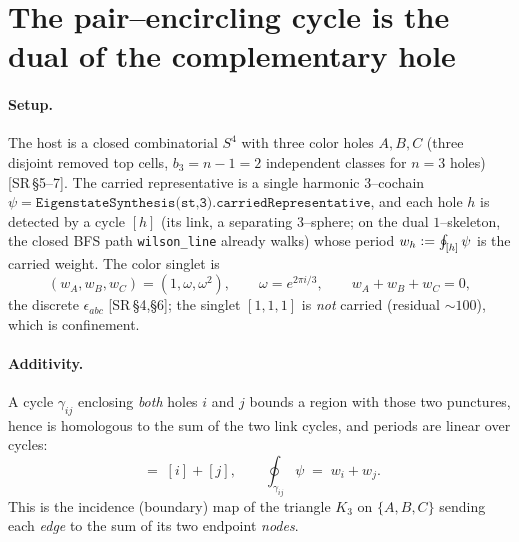 \documentclass[11pt,oneside]{article}
\newcommand{\eqdef}{\vcentcolon=}
\newcommand{\code}[1]{\texttt{#1}}
\theoremstyle{plain}
\begin{document}
\section{The pair--encircling cycle is the dual of the complementary hole}
\label{sec:duality}

\paragraph{Setup.}
The host is a closed combinatorial $S^4$ with three color holes $A,B,C$ (three
disjoint removed top cells, $b_3=n-1=2$ independent classes for $n=3$ holes)
[SR\,\S5--7]. The carried representative is a single harmonic $3$--cochain
$\psi=\code{EigenstateSynthesis(st,3).carriedRepresentative}$, and each hole $h$
is detected by a cycle $[h]$ (its link, a separating $3$--sphere; on the dual
$1$--skeleton, the closed BFS path \code{wilson\_line} already walks) whose period
$w_h\eqdef\oint_{[h]}\psi$ is the carried weight. The color singlet is
\begin{equation}
  (w_A,w_B,w_C)=(1,\omega,\omega^2),\qquad \omega=e^{2\pi i/3},
  \qquad w_A+w_B+w_C=0,
  \label{eq:singlet}
\end{equation}
the discrete $\epsilon_{abc}$ [SR\,\S4,\S6]; the singlet $[1,1,1]$ is \emph{not}
carried (residual $\sim100$), which is confinement.

\paragraph{Additivity.}
A cycle $\gamma_{ij}$ enclosing \emph{both} holes $i$ and $j$ bounds a region with
those two punctures, hence is homologous to the sum of the two link cycles, and
periods are linear over cycles:
\begin{equation}
  [\gamma_{ij}] \;=\; [i]+[j],
  \qquad
  \oint_{\gamma_{ij}}\psi \;=\; w_i+w_j .
  \label{eq:additivity}
\end{equation}
This is the incidence (boundary) map of the triangle $K_3$ on $\{A,B,C\}$ sending
each \emph{edge} to the sum of its two endpoint \emph{nodes}.
\end{document}
